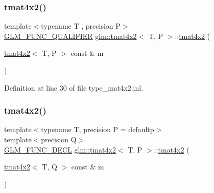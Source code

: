 \subsubsection{\texorpdfstring{tmat4x2()}{tmat4x2()}\hspace{0.1cm}{\footnotesize\ttfamily [2/22]}}
{\footnotesize\ttfamily template$<$typename T , precision P$>$ \\
\mbox{\hyperlink{setup_8hpp_a33fdea6f91c5f834105f7415e2a64407}{G\+L\+M\+\_\+\+F\+U\+N\+C\+\_\+\+Q\+U\+A\+L\+I\+F\+I\+ER}} \mbox{\hyperlink{structglm_1_1tmat4x2}{glm\+::tmat4x2}}$<$ T, P $>$\+::\mbox{\hyperlink{structglm_1_1tmat4x2}{tmat4x2}} (\begin{DoxyParamCaption}\item[{\mbox{\hyperlink{structglm_1_1tmat4x2}{tmat4x2}}$<$ T, P $>$ const \&}]{m }\end{DoxyParamCaption})}



Definition at line 30 of file type\+\_\+mat4x2.\+inl.

\mbox{\label{structglm_1_1tmat4x2_a9f5f9c3246c12a56efb4a81ccb83b844}} 
\subsubsection{\texorpdfstring{tmat4x2()}{tmat4x2()}\hspace{0.1cm}{\footnotesize\ttfamily [3/22]}}
{\footnotesize\ttfamily template$<$typename T, precision P = defaultp$>$ \\
template$<$precision Q$>$ \\
\mbox{\hyperlink{setup_8hpp_ab2d052de21a70539923e9bcbf6e83a51}{G\+L\+M\+\_\+\+F\+U\+N\+C\+\_\+\+D\+E\+CL}} \mbox{\hyperlink{structglm_1_1tmat4x2}{glm\+::tmat4x2}}$<$ T, P $>$\+::\mbox{\hyperlink{structglm_1_1tmat4x2}{tmat4x2}} (\begin{DoxyParamCaption}\item[{\mbox{\hyperlink{structglm_1_1tmat4x2}{tmat4x2}}$<$ T, Q $>$ const \&}]{m }\end{DoxyParamCaption})}

\mbox{\label{structglm_1_1tmat4x2_a167d8a564385d1fa509b3149f674769a}} 

